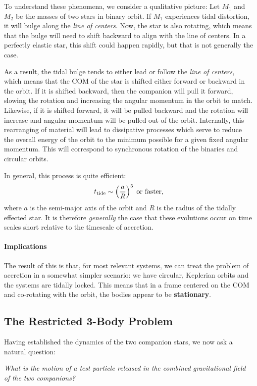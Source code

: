 To understand these phenomena, we consider a qualitative picture: Let $M_1$ and $M_2$ be the masses of two stars in binary orbit. If $M_1$ experiences tidal distortion, it will bulge along the \textit{line of centers}. Now, the star is also rotating, which means that the bulge will need to shift backward to align with the line of centers. In a perfectly elastic star, this shift could happen rapidly, but that is not generally the case. 
\par
As a result, the tidal bulge tends to either lead or follow the \textit{line of centers}, which means that the COM of the star is shifted either forward or backward in the orbit. If it is shifted backward, then the companion will pull it forward, slowing the rotation and increasing the angular momentum in the orbit to match. Likewise, if it is shifted forward, it will be pulled backward and the rotation will increase and angular momentum will be pulled out of the orbit. Internally, this rearranging of material will lead to dissipative processes which serve to reduce the overall energy of the orbit to the minimum possible for a given fixed angular momentum. This will correspond to synchronous rotation of the binaries and circular orbits.
\par
In general, this process is quite efficient:
\[
t_{\rm tide} \sim \left(\frac{a}{R}\right)^5\;\text{or faster},
\]
where $a$ is the semi-major axis of the orbit and $R$ is the radius of the tidally effected star. It is therefore \textit{generally} the case that these evolutions occur on time scales short relative to the timescale of accretion.
\paragraph{Implications}
The result of this is that, for most relevant systems, we can treat the problem of accretion in a somewhat simpler scenario: we have circular, Keplerian orbits and the systems are tidally locked. This means that in a frame centered on the COM and co-rotating with the orbit, the bodies appear to be \textbf{stationary}.

\subsection{The Restricted 3-Body Problem}

Having established the dynamics of the two companion stars, we now ask a natural question:
\vspace{0.25cm}
\begin{center}
    \textit{What is the motion of a test particle released in the combined gravitational field of the two companions?}
\end{center}
\vspace{0.25cm}

